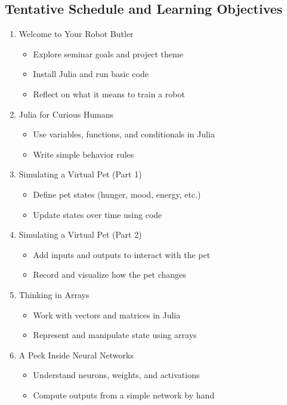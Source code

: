 \documentclass[10pt]{book}
\begin{document}
\subsection*{Tentative Schedule and Learning Objectives}

\begin{enumerate}[LO 1., itemindent=2em]
  \item
Welcome to Your Robot Butler
\begin{itemize}
  \item Explore seminar goals and project theme
  \item Install Julia and run basic code
  \item Reflect on what it means to train a robot
\end{itemize}

\item
 Julia for Curious Humans
\begin{itemize}
  \item Use variables, functions, and conditionals in Julia
  \item Write simple behavior rules
\end{itemize}

\item
 Simulating a Virtual Pet (Part 1)
\begin{itemize}
  \item Define pet states (hunger, mood, energy, etc.)
  \item Update states over time using code
\end{itemize}

\item
 Simulating a Virtual Pet (Part 2)
\begin{itemize}
  \item Add inputs and outputs to interact with the pet
  \item Record and visualize how the pet changes
\end{itemize}

\item
 Thinking in Arrays
\begin{itemize}
  \item Work with vectors and matrices in Julia
  \item Represent and manipulate state using arrays
\end{itemize}


\item A Peek Inside Neural Networks
\begin{itemize}
  \item Understand neurons, weights, and activations
  \item Compute outputs from a simple network by hand
\end{itemize}


\end{enumerate}
\end{document}
